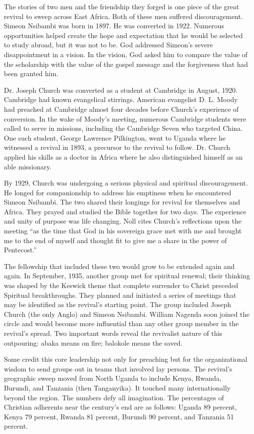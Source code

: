 The stories of two men and the friendship they forged is one piece of the great revival to sweep
across East Africa. Both of these men suffered discouragement. Simeon Nsibambi was born in 1897. He
was converted in 1922. Numerous opportunities helped create the hope and expectation that he would
be selected to study abroad, but it was not to be. God addressed Simeon’s severe disappointment in a
vision. In the vision, God asked him to compare the value of the scholarship with the value of the
gospel message and the forgiveness that had been granted him.

Dr. Joseph Church was converted as a student at Cambridge in August, 1920. Cambridge had known
evangelical stirrings. American evangelist D. L. Moody had preached at Cambridge almost four decades
before Church’s experience of conversion. In the wake of Moody’s meeting, numerous Cambridge
students were called to serve in missions, including the Cambridge Seven who targeted China. One
such student, George Lawrence Pilkington, went to Uganda where he witnessed a revival in 1893, a
precursor to the revival to follow. Dr. Church applied his skills as a doctor in Africa where he
also distinguished himself as an able missionary.

By 1929, Church was undergoing a serious physical and spiritual discouragement. He longed for
companionship to address his emptiness when he encountered Simeon Nsibambi. The two shared their
longings for revival for themselves and Africa. They prayed and studied the Bible together for two
days. The experience and unity of purpose was life changing. Noll cites Church’s reflections upon
the meeting “as the time that God in his sovereign grace met with me and brought me to the end of
myself and thought fit to give me a share in the power of Pentecost.”

The fellowship that included these two would grow to be extended again and again. In September,
1935, another group met for spiritual renewal; their thinking was shaped by the Keswick theme that
complete surrender to Christ preceded Spiritual breakthroughs. They planned and initiated a series
of meetings that may be identified as the revival’s starting point. The group included Joseph Church
(the only Anglo) and Simeon Nsibambi. William Nagenda soon joined the circle and would become more
influential than any other group member in the revival’s spread. Two important words reveal the
revivalist nature of this outpouring: abaka means on fire; balokole means the saved.

Some credit this core leadership not only for preaching but for the organizational wisdom to send
groups out in teams that involved lay persons. The revival’s geographic sweep moved from North
Uganda to include Kenya, Rwanda, Burundi, and Tanzania (then Tanganyika). It touched many
internationally beyond the region. The numbers defy all imagination. The percentages of Christian
adherents near the century’s end are as follows: Uganda 89 percent, Kenya 79 percent, Rwanda 81
percent, Burundi 90 percent, and Tanzania 51 percent.

